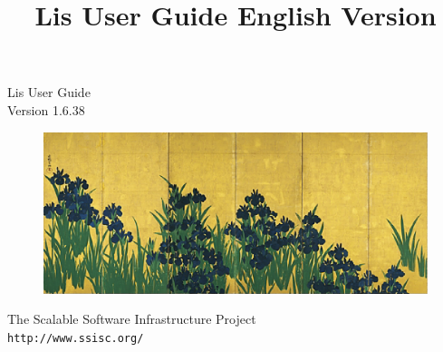 \documentclass[a4paper]{article}
\title{Lis User Guide English Version}
\author{}
\date{}
\begin{document}
\vspace*{4cm}
\begin{flushleft}
{\Large Lis User Guide}\\
Version 1.6.38
\end{flushleft}

\vspace*{2cm}
\begin{figure}[h]
\includegraphics[scale=0.7]{irises_korin.eps}
\end{figure}

\vspace*{2cm}
\begin{flushleft}
{\large The Scalable Software Infrastructure
Project\\
{\tt http://www.ssisc.org/}}\\
\end{flushleft}

\vspace*{5mm}
\thispagestyle{empty}
\end{document}
